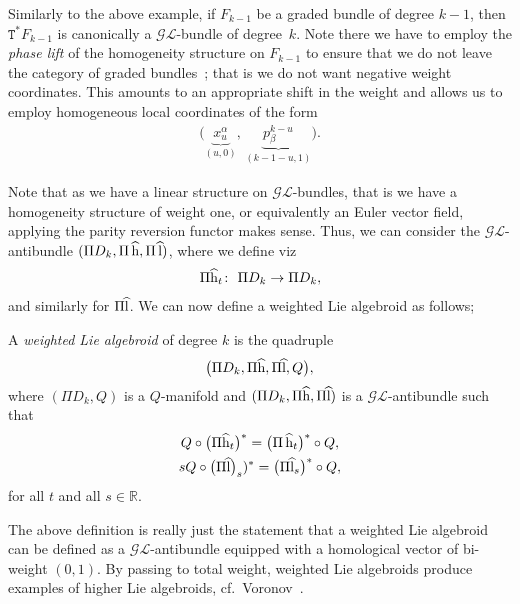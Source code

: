 \documentclass[pdftex]{sigma}
\newcommand{\rmh}{\textnormal{h}}
\newcommand{\rml}{\textnormal{l}}
\def\sT{{\mathtt T}}
\numberwithin{equation}{section}
\begin{document}
\begin{Example}
Similarly to the above example, if $F_{k-1}$ be a graded bundle of degree $k-1$, then $\sT^{*} F_{k-1}$ is canonically a $\mathcal{GL}$-bundle of degree~$k$. Note there we have to employ the \emph{phase lift} of the homogeneity structure on $F_{k-1}$ to ensure that we do not leave the category of graded bundles~\cite{Grabowski2013}; that is we do not want negative weight coordinates. This amounts to an appropriate shift in the weight and allows us to employ homogeneous local coordinates of the form
\begin{gather*}
\big(\underbrace{x^{\alpha}_{u}}_{(u,0)}, \, \underbrace{p_{\beta}^{k-u}}_{(k-1-u, 1)}\big).
\end{gather*}
\end{Example}
Note that as we have a linear structure on $\mathcal{GL}$-bundles, that is we have a homogeneity structure of weight one, or equivalently an Euler vector f\/ield, applying the parity reversion functor makes sense. Thus, we can consider the $\mathcal{GL}$-antibundle $(\Pi D_{k}, \Pi\,\widehat{\rmh}, \Pi\, \widehat{\rml})$, where we def\/ine viz
\begin{gather*}
\Pi \widehat {\rmh}_{t}\colon \ \Pi D_{k} \rightarrow \Pi D_{k},
\end{gather*}
\noindent and similarly for $\Pi  \widehat{\rml}$. We can now def\/ine a weighted Lie algebroid as follows;

\begin{Definition}
A \emph{weighted Lie algebroid} of degree $k$ is the quadruple
\begin{gather*}
\big(\Pi D_{k},\Pi \widehat{\rmh}, \Pi  \widehat{\rml}, Q\big ),
\end{gather*}
 where $(\Pi D_{k}, Q)$ is a $Q$-manifold and  $(\Pi D_{k},\Pi \widehat{\rmh}, \Pi \widehat{\rml})$ is a $\mathcal{GL}$-antibundle such that
\begin{gather}
\label{xx} Q \circ \big(\Pi \widehat{\rmh}_{t}\big)^{*}  =  \big(\Pi\,\widehat{\rmh}_{t}\big)^{*} \circ Q,\\
s   Q \circ \big(\Pi  \widehat{\rml}\big)_{s})^{*}  =  \big(\Pi \widehat{\rml}_{s}\big)^{*} \circ Q,\nonumber
\end{gather}
for all $t$  and all $s \in \mathbb{R}$.
\end{Definition}


The above def\/inition is really just the statement that a weighted Lie algebroid can be def\/ined as a $\mathcal{GL}$-antibundle equipped with a homological vector of bi-weight $(0,1)$.
By passing to total weight,  weighted Lie algebroids produce examples of higher Lie algebroids, cf.\ Voronov~\cite{voronov-2010}.
\end{document}
